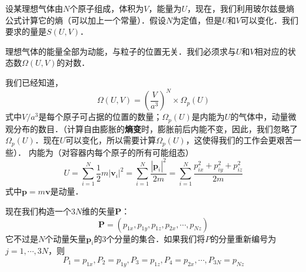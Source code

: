 
设某理想气体由$N $个原子组成，体积为$V$，能量为$U$，现在，我们利用玻尔兹曼熵公式计算它的熵（可以加上一个常量）．假设$N $为定值，但是$U $和$V $可以变化．我们要求的量是$S(U,V)$．

理想气体的能量全部为动能，与粒子的位置无关．我们必须求与$U$和$V$相对应的状态数$\Omega(U,V)$的对数．

我们已经知道，
\begin{equation}
\Omega \left( U,V \right) =\left( \frac{V}{a^3} \right) ^N\times \Omega _p\left( U \right) 
\end{equation}
式中$V/a^3$是每个原子可占据的位置的数量；$\Omega_p(U)$是内能为$U$的气体中，动量微观分布的数目．（计算自由膨胀的\textbf{熵变}时，膨胀前后内能不变，因此，我们忽略了$\Omega_p(U)$．现在$U$可以变化，所以需要计算$\Omega_p(U)$，这使得我们的工作会更艰苦一些）．
内能为（对容器内每个原子的所有可能组态）
\begin{equation}
U=\sum_{i=1}^N{\frac{1}{2}m\left| \boldsymbol{v}_i \right|^2}=\sum_{i=1}^N{\frac{\left| \boldsymbol{p}_i \right|^2}{2m}}=\sum_{i=1}^N{\frac{p_{ix}^{2}+p_{iy}^{2}+p_{iz}^{2}}{2m}}
\end{equation}
式中$\boldsymbol p = m\boldsymbol v$是动量．

现在我们构造一个$3N $维的矢量$\mathbf P$：
\begin{equation}
\mathbf{P}=\left( p_{1x},p_{1y},p_{1z},p_{2x},\cdots ,p_{Nz} \right) 
\end{equation}
它不过是$N$个动量矢量$\boldsymbol p_i$的$3 $个分量的集合．如果我们将$P $的分量重新编号为$j=1, \cdots , 3N$，则
\begin{equation}
P_1=p_{1x},P_2=p_{1y},P_3=p_{1z},P_4=p_{2x},\cdots ,P_{3N}=p_{Nz}
\end{equation}